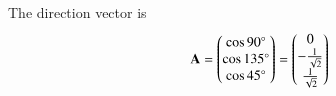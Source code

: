 The direction vector is
\begin{align}
\mathbf{A}=\begin{pmatrix}\cos 90\degree\\ \cos 135\degree\\ \cos 45\degree\end{pmatrix}=\begin{pmatrix}0\\-\frac{1}{\sqrt{2}}\\ \frac{1}{\sqrt{2}}\end{pmatrix}
\end{align}
